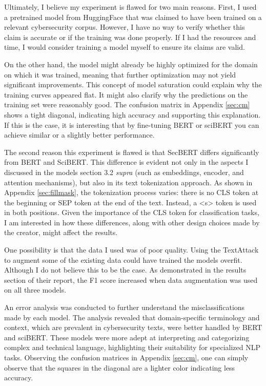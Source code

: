\documentclass[11pt]{article}
\begin{document}
Ultimately, I believe my experiment is flawed for two main reasons. First, I used a pretrained model from HuggingFace that was claimed to have been trained on a relevant cybersecurity corpus. However, I have no way to verify whether this claim is accurate or if the training was done properly. If I had the resources and time, I would consider training a model myself to ensure its claims are valid. 

On the other hand, the model might already be highly optimized for the domain on which it was trained, meaning that further optimization may not yield significant improvements. This concept of model saturation could explain why the training curves appeared flat. It might also clarify why the predictions on the training set were reasonably good. The confusion matrix in Appendix \ref{sec:cm} shows a tight diagonal, indicating high accuracy and supporting this explanation. If this is the case, it is interesting that by fine-tuning BERT or sciBERT you can achieve similar or a slightly better performance. 

The second reason this experiment is flawed is that SecBERT differs significantly from BERT and SciBERT. This difference is evident not only in the aspects I discussed in the models section 3.2 \textit{supra} (such as embeddings, encoder, and attention mechanisms), but also in its text tokenization approach. As shown in Appendix \ref{sec:fillmask}, the tokenization process varies: there is no CLS token at the beginning or SEP token at the end of the text. Instead, a <s> token is used in both positions. Given the importance of the CLS token for classification tasks, I am interested in how these differences, along with other design choices made by the creator, might affect the results.

One possibility is that the data I used was of poor quality. Using the TextAttack to augment some of the existing data could have trained the models overfit. Although I do not believe this to be the case. As \cite{grigorescu2022cve2att} demonstrated in the results section of their report, the F1 score increased when data augmentation was used on all three models. 

An error analysis was conducted to further understand the misclassifications made by each model. The analysis revealed that domain-specific terminology and context, which are prevalent in cybersecurity texts, were better handled by BERT and sciBERT. These models were more adept at interpreting and categorizing complex and technical language, highlighting their suitability for specialized NLP tasks. Observing the confusion matrices in Appendix \ref{sec:cm}, one can simply observe that the squares in the diagonal are a lighter color indicating less accuracy. 
\end{document}
